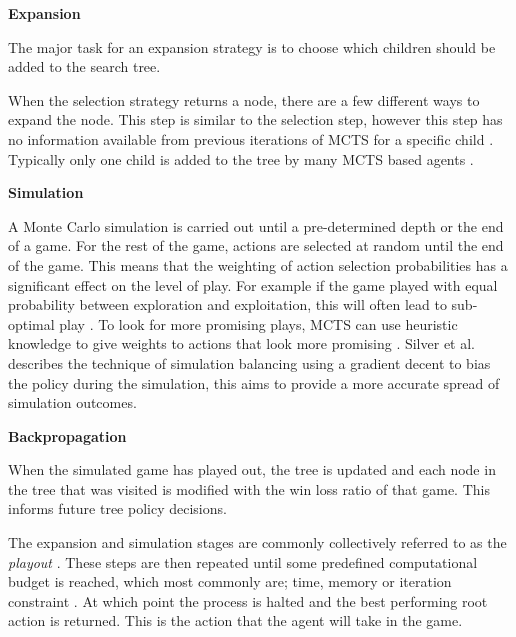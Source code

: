 \documentclass[journal]{IEEEtran}
\begin{document}
		
		\textbf{Expansion}
		
			The major task for an expansion strategy is to choose which children should be added to the search tree.
			
			When the selection strategy returns a node, there are a few different ways to expand the node. This step is similar to the selection step, however this step has no information available from previous iterations of MCTS for a specific child \cite{schuster2015mcts}. 
			Typically only one child is added to the tree by many MCTS based agents \cite{chaslot2008monte, schuster2015mcts}. 
			

		\textbf{Simulation}
		
			A Monte Carlo simulation is carried out until a pre-determined depth or the end of a game.
			For the rest of the game, actions are selected at random until the end of the game. This means that the weighting of action selection probabilities has a significant effect on the level of play. For example if the game played with equal probability between exploration and exploitation, this will often lead to sub-optimal play \cite{chaslot2008monte}. 
			To look for more promising plays, MCTS can use heuristic knowledge to give weights to actions that look more promising \cite{perez2014solving}.
			Silver et al. \cite{silver2009monte} describes the technique of simulation balancing using a gradient decent to bias the policy during the simulation, this aims to provide a more accurate spread of simulation outcomes.

		\textbf{Backpropagation}
		
			When the simulated game has played out, the tree is updated and each node in the tree that was visited is modified with the win loss ratio of that game. This informs future tree policy decisions.
			
			The expansion and simulation stages are commonly collectively referred to as the \textit{playout} \cite{powley2014information}.
			These steps are then repeated until some predefined computational budget is reached, which most commonly are; time, memory or iteration constraint \cite{browne2012survey}. At which point the process is halted and the best performing root action is returned. This is the action that the agent will take in the game.


		
\end{document}
